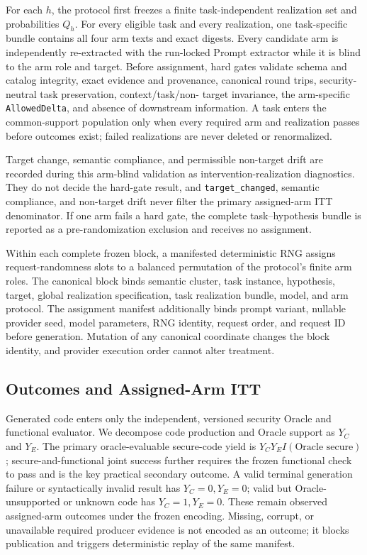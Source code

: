 \documentclass[acmsmall,screen,review,anonymous]{acmart}
\begin{document}
For each $h$, the protocol first freezes a finite task-independent realization
set and probabilities $Q_h$. For every eligible task and every realization,
one task-specific bundle contains all four arm texts and exact digests. Every
candidate arm is independently re-extracted with the run-locked Prompt
extractor while it is blind to the arm role and target. Before assignment, hard
gates validate schema and catalog integrity, exact evidence and provenance,
canonical round trips, security-neutral task preservation, context/task/non-
target invariance, the arm-specific \texttt{AllowedDelta}, and absence of
downstream information. A task enters the common-support population only when
every required arm and realization passes before outcomes exist; failed
realizations are never deleted or renormalized.

Target change, semantic compliance, and permissible non-target drift are
recorded during this arm-blind validation as intervention-realization
diagnostics. They
do not decide the hard-gate result, and \texttt{target\_changed}, semantic
compliance, and non-target drift never filter the primary assigned-arm ITT
denominator. If one arm fails a hard gate, the complete task--hypothesis bundle
is reported as a pre-randomization exclusion and receives no assignment.

Within each complete frozen block, a manifested deterministic RNG assigns
request-randomness slots to a balanced permutation of the protocol's finite arm
roles. The canonical block binds semantic cluster, task instance, hypothesis,
target, global realization specification, task realization bundle, model, and
arm protocol. The assignment manifest additionally binds prompt variant,
nullable provider seed, model parameters, RNG identity, request order, and
request ID before generation. Mutation of any canonical coordinate changes the
block identity, and provider execution order cannot alter treatment.

\subsection{Outcomes and Assigned-Arm ITT}

Generated code enters only the independent, versioned security Oracle and
functional evaluator. We decompose code production and Oracle support as
$Y_C$ and $Y_E$. The primary oracle-evaluable secure-code yield is
$Y_CY_E I(\text{Oracle secure})$; secure-and-functional joint success further
requires the frozen functional check to pass and is the key practical
secondary outcome. A valid terminal generation failure or syntactically
invalid result has $Y_C=0,Y_E=0$; valid but Oracle-unsupported or unknown code
has $Y_C=1,Y_E=0$. These remain observed assigned-arm outcomes under the
frozen encoding. Missing, corrupt, or unavailable required producer evidence
is not encoded as an outcome; it blocks publication and triggers deterministic
replay of the same manifest.
\end{document}
